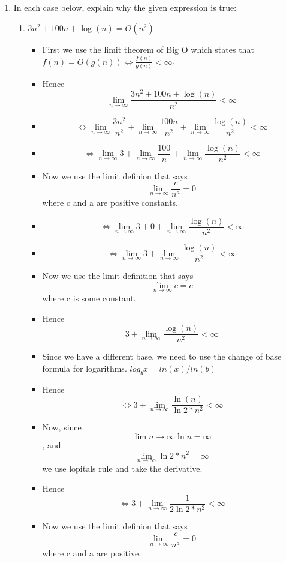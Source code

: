 \documentclass{article}
\begin{document}
\begin{enumerate}
\item In each case below, explain why the given expression is true:
  \begin{enumerate}
  \item $3n^{2} + 100n + \log{(n)} = O(n^{2})$
    \begin{itemize}
    \item [] First we use the limit theorem of Big O which states that $f(n)=O(g(n)) \Leftrightarrow \frac{f(n)}{g(n)} < \infty$.
    \item [] Hence {\Large $$\lim_{n \to \infty} \frac{3n^{2} +100n +\log{(n)}}{n^{2}} < \infty$$}
    \item [] {\Large $$\Leftrightarrow \lim_{n \to \infty} \frac{3n^{2}}{n^{2}} + \lim_{n \to \infty} \frac{100n}{n^{2}} + \lim_{n \to \infty} \frac{\log{(n)}}{n^{2}} < \infty$$}
    \item [] {\Large $$\Leftrightarrow \lim_{n \to \infty} 3 + \lim_{n \to \infty} \frac{100}{n} + \lim_{n \to \infty} \frac{\log{(n)}}{n^{2}} < \infty$$}
    \item [] Now we use the limit definion that says {\Large $$\lim_{n \to \infty} \frac{c}{n^{a}} =0$$} where c and a are positive constants.
    \item [] {\Large $$\Leftrightarrow \lim_{n \to \infty} 3 +0+ \lim_{n \to \infty} \frac{\log{(n)}}{n^{2}} < \infty$$}
    \item [] {\Large $$\Leftrightarrow \lim_{n \to \infty} 3 + \lim_{n \to \infty} \frac{\log{(n)}}{n^{2}} < \infty$$}
    \item [] Now we use the limit definition that says $$\lim_{n \to \infty} c = c$$ where c is some constant.
    \item [] Hence {\Large $$3 + \lim_{n \to \infty} \frac{\log{(n)}}{n^{2}} < \infty$$}
    \item [] Since we have a different base, we need to use the change of base formula for logarithms. $log_{b}x =ln(x)/ln(b)$
    \item [] Hence {\Large $$\Leftrightarrow 3 + \lim_{n \to \infty} \frac{\ln{(n)}}{\ln{2}*n^{2}} < \infty$$}
    \item [] Now, since $$\lim{n \to \infty} \ln{n} = \infty$$, and $$\lim_{n \to \infty} \ln{2}*n^{2} = \infty$$ we use lopitals rule and take the derivative. 
    \item [] Hence {\Large $$\Leftrightarrow 3 + \lim_{n \to \infty} \frac{1}{2\ln{2}*n^{2}} < \infty$$}
    \item [] Now we use the limit definion that says {\Large $$\lim_{n \to \infty} \frac{c}{n^{a}} =0$$} where c and a are positive.

\end{itemize}
\end{enumerate}
\end{enumerate}
\end{document}
